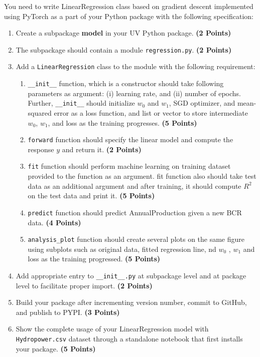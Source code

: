 \documentclass[12pt, xcolor=dvipsnames,svgnames,x11names]{article}
\begin{document}
You need to write LinearRegression class based on gradient descent implemented using PyTorch as a part of your Python package with the following specification:

\begin{enumerate}

\item Create a subpackage \textbf{model} in your UV Python package. \hfill \textbf{(2 Points)}

\item The subpackage should contain a module \texttt{regression.py}. \hfill \textbf{(2 Points)}

\item Add a \texttt{LinearRegression} class to the module with the following requirement:

\begin{enumerate}

\item \texttt{\_\_init\_\_} function, which is a constructor should  take following parameters as argument: (i) learning rate, and (ii) number of epochs. Further, \texttt{\_\_init\_\_} should initialize $w_0$ and $w_1$, SGD optimizer, and mean-squared error as a loss function, and list or vector to store intermediate $w_0$, $w_1$, and loss as the training progresses. \hfill \textbf{(5 Points)}

\item \texttt{forward} function should specify the linear model and compute the response $y$ and return it. \hfill \textbf{(2 Points)}

\item \texttt{fit} function should perform machine learning on training dataset provided to the function as an argument. fit function also should take test data as an additional argument and after training, it should compute $R^2$ on the test data and print it. \hfill \textbf{(5 Points)}

\item \texttt{predict} function should predict AnnualProduction given a new BCR data.  \textbf{(4 Points)}

\item \texttt{analysis\_plot} function should create several plots on the same figure using subplots such as original data, fitted regression line, nd $w_0$ , $w_1$ and loss as the training progressed. \hfill \textbf{(5 Points)}



\end{enumerate}


\item Add appropriate entry to \texttt{\_\_init\_\_.py} at subpackage level and at package level to facilitate proper import. \hfill \textbf{(2 Points)}

\item Build your package after incrementing version number, commit to GitHub, and publish to PYPI. \hfill \textbf{(3 Points)}

\item Show the complete usage of your LinearRegression model with \texttt{Hydropower.csv} dataset through a standalone notebook that first installs your package. \hfill \textbf{(5 Points)}
\end{enumerate}
\end{document}
